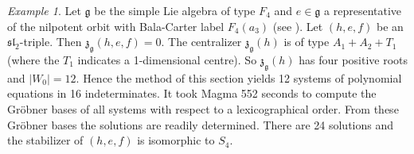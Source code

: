\documentclass[a4paper,10pt]{amsart}
\newcommand{\mf}{\mathfrak}
\newcommand{\g}{\mf{g}}
\newcommand{\ssl}{\mf{sl}}
\newcommand{\z}{\mf{z}}
\numberwithin{equation}{section}
\theoremstyle{remark}
\theoremstyle{remark}
\newtheorem{example}[theorem]{Example}
\begin{document}
\begin{example}
Let $\g$ be the simple Lie algebra of type $F_4$ and $e\in \g$ a representative
of the nilpotent orbit with Bala-Carter label $F_4(a_3)$
(see \cite[\S 8.4]{colmcgov}). Let $(h,e,f)$ be an $\ssl_2$-triple. Then
$\z_\g(h,e,f)=0$. The centralizer $\z_\g(h)$ is of type $A_1+A_2+T_1$ (where
the $T_1$ indicates a 1-dimensional centre). So  $\z_\g(h)$ has four positive
roots and $|W_0|=12$. Hence the method of this section yields 12 systems of
polynomial equations in 16 indeterminates. It took {\sc Magma} 552 seconds
to compute the Gr\"obner bases of all systems with respect to a lexicographical
order. From these Gr\"obner bases the solutions are readily determined. 
There are 24 solutions and the stabilizer of $(h,e,f)$ is isomorphic to $S_4$.
\end{example}
\end{document}
